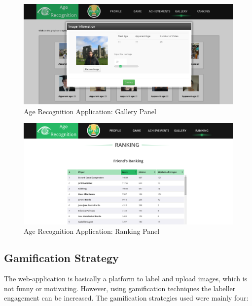 \begin{figure}[!h]
	\centering
	\includegraphics[width=\textwidth]{figures/age_app_2}
	\caption{Age Recognition Application: Gallery Panel}
	\label{fig:gallery}
\end{figure}

\begin{figure}[!h]
	\centering
	\includegraphics[width=\textwidth]{figures/age_app_3}
	\caption{Age Recognition Application: Ranking Panel}
	\label{fig:ranking}
\end{figure}

\subsection{Gamification Strategy}
The web-application is basically a platform to label and upload images, which is not funny or motivating. However, using gamification techniques the labeller engagement can be increased. The gamification strategies used were mainly four:


